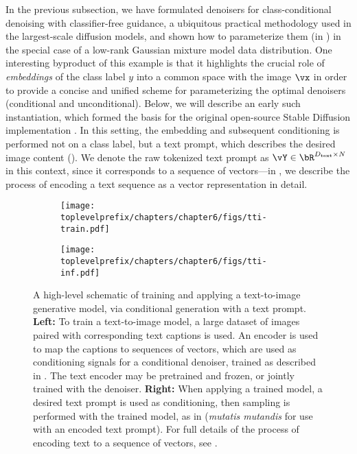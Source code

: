 \documentclass[../../book-main.tex]{subfiles}
\begin{document}
In the previous subsection, we have formulated denoisers for class-conditional
denoising with classifier-free guidance, a ubiquitous practical methodology used
in the largest-scale diffusion models, and shown how to parameterize them (in
) in the special case of a low-rank
Gaussian mixture model data distribution.
One interesting byproduct of this example is that it highlights the crucial role
of \textit{embeddings} of the class label $y$ into a common space with the image $\vx$ in
order to provide a concise and unified scheme for parameterizing the optimal
denoisers (conditional and unconditional).
Below, we will describe an early such instantiation, which
formed the basis for the original open-source Stable Diffusion implementation
\cite{rombach2022high}.
In this setting, the embedding and subsequent conditioning is performed not on
a class label, but a text prompt, which describes the desired image content
(). We denote the raw tokenized text prompt as $\vY \in
\bR^{D_{\mathrm{text}} \times N}$ in this context, since it corresponds to a sequence of
vectors---in , we describe the process of encoding a text
sequence as a vector representation in detail.

\begin{figure}[tbp]
  \centering
  \begin{subfigure}{0.47\textwidth}
    \texttt{[image: \\toplevelprefix/chapters/chapter6/figs/tti-train.pdf]}
    \caption{}
  \end{subfigure}
  \hfill
  \begin{subfigure}{0.47\textwidth}
    \texttt{[image: \\toplevelprefix/chapters/chapter6/figs/tti-inf.pdf]}
    \caption{}
  \end{subfigure}

  \caption{A high-level schematic of training and applying a text-to-image
  generative model, via conditional generation with a text prompt. \textbf{Left:}
  To train a text-to-image model, a large dataset of images paired with
  corresponding text captions is used. An encoder is used to map the captions to
  sequences of vectors, which are used as conditioning signals for a conditional
  denoiser, trained as described in . The text encoder may be
  pretrained and frozen, or jointly trained with the denoiser. \textbf{Right:}
  When applying a trained model, a desired text prompt is used as conditioning,
  then sampling is performed with the trained model, as in
   (\textit{mutatis mutandis} for
  use with an encoded text prompt). For full details of the process of encoding
  text to a sequence of vectors, see .}
  \label{fig:text-to-image}
\end{figure}
\end{document}
